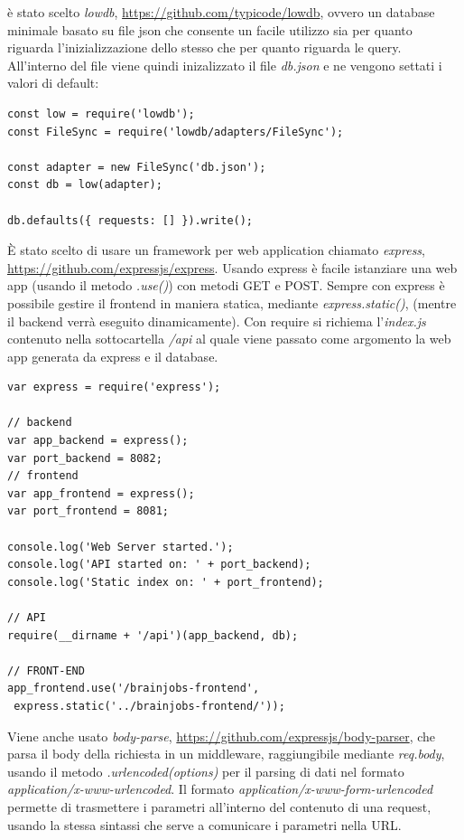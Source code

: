 \documentclass[a4paper,12pt, oneside]{book}
\begin{document}
è stato scelto \textit{lowdb}, \url{https://github.com/typicode/lowdb}, ovvero
un database minimale basato su file json che consente un facile utilizzo sia per quanto riguarda l'inizializzazione dello stesso che per quanto riguarda le query. All'interno del file viene quindi inizalizzato il file \textit{db.json} e ne vengono settati i valori di default:
\begin{shaded}
\begin{verbatim}
const low = require('lowdb');
const FileSync = require('lowdb/adapters/FileSync');

const adapter = new FileSync('db.json');
const db = low(adapter);

db.defaults({ requests: [] }).write();
\end{verbatim}
\end{shaded}
È stato scelto di usare un framework per web application chiamato \textit{express},
\url{https://github.com/expressjs/express}. Usando express è facile istanziare una
web app (usando il metodo \textit{.use()}) con metodi GET e POST. Sempre con express è possibile gestire il frontend
in maniera statica, mediante \textit{express.static()}, (mentre il backend verrà eseguito dinamicamente). Con require
si richiema l'\textit{index.js} contenuto nella sottocartella \textit{/api} al quale viene passato come argomento la web app generata da express e il database.
\begin{shaded}
\begin{verbatim}
var express = require('express');

// backend
var app_backend = express();
var port_backend = 8082;
// frontend
var app_frontend = express();
var port_frontend = 8081;

console.log('Web Server started.');
console.log('API started on: ' + port_backend);
console.log('Static index on: ' + port_frontend);

// API
require(__dirname + '/api')(app_backend, db);

// FRONT-END
app_frontend.use('/brainjobs-frontend',
 express.static('../brainjobs-frontend/'));
\end{verbatim}
\end{shaded}
Viene anche usato \textit{body-parse}, \url{https://github.com/expressjs/body-parser}, che parsa il body della richiesta in un middleware, raggiungibile mediante \textit{req.body}, usando il metodo \textit{.urlencoded({options})} per il parsing di dati nel formato \textit{application/x-www-urlencoded}. Il formato\textit{ application/x-www-form-urlencoded} permette di trasmettere i parametri all'interno del contenuto di una request, usando la stessa sintassi che serve a comunicare i parametri nella URL.
\end{document}
